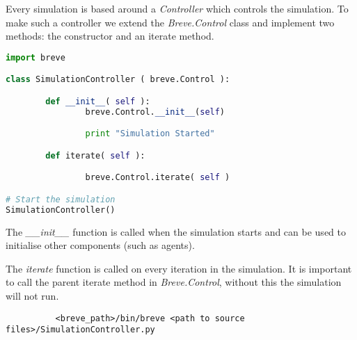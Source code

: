 
Every simulation is based around a \textit{Controller} which controls the simulation. To make such a controller we extend the \textit{Breve.Control} class and implement two methods: the constructor and an iterate method.

\begin{lstlisting}[language=Python]
import breve

class SimulationController ( breve.Control ):

        def __init__( self ):
                breve.Control.__init__(self)

                print "Simulation Started"

        def iterate( self ):

                breve.Control.iterate( self )

# Start the simulation
SimulationController()
\end{lstlisting}




The \textit{\_\_init\_\_} function is called when the simulation starts and can be used to initialise other components (such as agents). 

The \textit{iterate} function is called on every iteration in the simulation. It is important to call the parent iterate method in \textit{Breve.Control}, without this the simulation will not run.


\begin{verbatim}
		  <breve_path>/bin/breve <path to source files>/SimulationController.py
\end{verbatim}